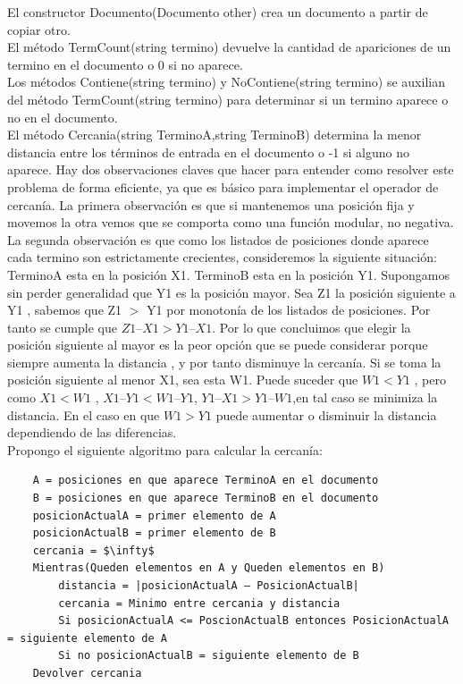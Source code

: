 \documentclass{article}
\begin{document}
El constructor Documento(Documento other) crea un documento a partir de copiar otro.\\
El método TermCount(string termino) devuelve la cantidad de apariciones de un termino en el documento o 0 si no aparece.\\
Los métodos Contiene(string termino) y NoContiene(string termino) se auxilian del método TermCount(string termino) para determinar si un termino aparece o no en el documento.\\
El método Cercania(string TerminoA,string TerminoB) determina la menor distancia entre los términos de entrada en el documento o -1 si alguno no aparece. Hay dos observaciones claves que hacer para entender como resolver este problema de forma eficiente, ya que es básico para implementar el operador de cercanía. La primera observación es que si mantenemos una posición fija y movemos la otra vemos que se comporta como una función modular, no negativa. La segunda observación es que como los listados de posiciones donde aparece cada termino son estrictamente crecientes, consideremos la siguiente situación:\\
TerminoA esta en la posición X1. TerminoB esta en la posición Y1. Supongamos sin perder generalidad que Y1 es la posición mayor. Sea Z1 la posición siguiente a Y1 , sabemos que Z1 $>$ Y1 por monotonía de los listados de posiciones. Por tanto se cumple que $Z1 – X1 > Y1 – X1$. Por lo que concluimos que elegir la posición siguiente al mayor es la peor opción que se puede considerar porque siempre aumenta la distancia , y por tanto disminuye la cercanía. Si se toma la posición siguiente al menor X1, sea esta W1. Puede suceder que $W1 < Y1$ , pero como $X1 < W1$ , $X1 – Y1 < W1 – Y1$, $Y1 – X1 > Y1 – W1$,en tal caso se minimiza la distancia. En el caso en que $W1 > Y1$ puede aumentar o disminuir la distancia dependiendo de las diferencias.\\
Propongo el siguiente algoritmo para calcular la cercanía:
\begin{verbatim}
    A = posiciones en que aparece TerminoA en el documento
    B = posiciones en que aparece TerminoB en el documento
    posicionActualA = primer elemento de A
    posicionActualB = primer elemento de B
    cercania = $\infty$
    Mientras(Queden elementos en A y Queden elementos en B)
        distancia = |posicionActualA – PosicionActualB|
        cercania = Minimo entre cercania y distancia
        Si posicionActualA <= PoscionActualB entonces PosicionActualA = siguiente elemento de A
        Si no posicionActualB = siguiente elemento de B
    Devolver cercania
\end{verbatim}
\end{document}
